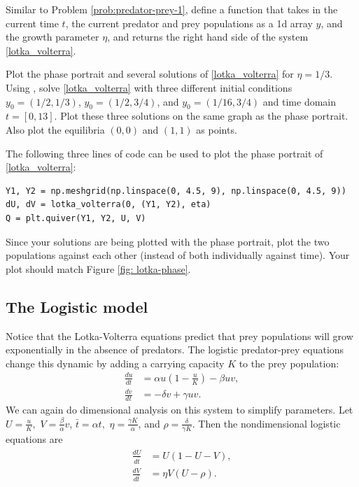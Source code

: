 \begin{problem}
Similar to Problem \ref{prob:predator-prey-1}, define a function  that takes in the current time $t$, the current predator and prey populations as a 1d array $y$, and the growth parameter $\eta$, and returns the right hand side of the system \eqref{lotka_volterra}.

Plot the phase portrait and several solutions of \eqref{lotka_volterra} for $\eta=1/3$.
Using , solve \eqref{lotka_volterra} with three different initial conditions $y_0 = (1/2, 1/3)$, $y_0=(1/2, 3/4)$, and $y_0=(1/16, 3/4)$ and time domain $t = [0,13]$. Plot these three solutions on the same graph as the phase portrait.
Also plot the equilibria $(0,0)$ and $(1,1)$ as points.

The following three lines of code can be used to plot the phase portrait of \eqref{lotka_volterra}:
\begin{lstlisting}
Y1, Y2 = np.meshgrid(np.linspace(0, 4.5, 9), np.linspace(0, 4.5, 9))
dU, dV = lotka_volterra(0, (Y1, Y2), eta)
Q = plt.quiver(Y1, Y2, U, V)
\end{lstlisting}

Since your solutions are being plotted with the phase portrait, plot the two populations against each other (instead of both individually against time). Your plot should match Figure \ref{fig: lotka-phase}.
\end{problem}


\subsection*{The Logistic model}
Notice that the Lotka-Volterra equations predict that prey populations will grow exponentially in the absence of predators. The logistic predator-prey equations change this dynamic by adding a carrying capacity $K$ to the prey population:
\begin{align*}
	\frac{du}{dt} &= \alpha u\left(1 -\frac{u}{K}\right) - \beta uv,\\
	\frac{dv}{dt} &= -\delta v + \gamma uv.
\end{align*}
We can again do dimensional analysis on this system to simplify parameters. Let $U = \frac{u}{K},$ $V = \frac{\beta}{\alpha}v$, $\bar{t} = \alpha t,$  $\eta = \frac{\gamma K}{\alpha}$, and $\rho = \frac{\delta}{\gamma K}$.
Then the nondimensional logistic equations are
\begin{align}
	\begin{split}
	\frac{dU}{d\bar{t}} &= U(1-U-V),\\
	\frac{dV}{d\bar{t}} &= \eta V (U-\rho).
	\end{split} \label{logistic_pred_prey}
\end{align}

